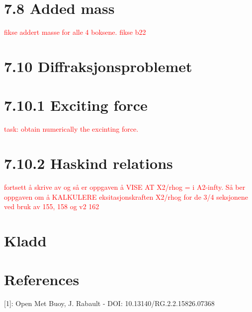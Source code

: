 \documentclass{article}
\begin{document}
\section{7.8 Added mass}
%
\textcolor{red}{fikse addert masse for alle 4 boksene. fikse b22}

\section{7.10 Diffraksjonsproblemet}
%

\section{7.10.1 Exciting force}

\textcolor{red}{task: obtain numerically the excinting force. }

\section{7.10.2 Haskind relations}

\textcolor{red}{fortsett å skrive av og så er oppgaven å VISE AT X2/rhog = i A2-infty. Så ber oppgaven om å KALKULERE eksitasjonskraften X2/rhog  for de 3/4 seksjonene ved bruk av 155, 158 og v2 162}

\section{Kladd}
%

\section{References}
[1]: Open Met Buoy, J. Rabault - DOI: 10.13140/RG.2.2.15826.07368
\end{document}
